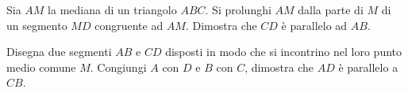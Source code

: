 \begin{multicols}{2}
\begin{esercizio}
\label{ese:3.38}
Sia $AM$ la mediana di un triangolo $ABC$. Si prolunghi $AM$ dalla 
parte di $M$ di un segmento $MD$ congruente ad $AM$. Dimostra che 
$CD$ è parallelo ad $AB$.
\end{esercizio}


\begin{esercizio}
\label{ese:3.42}
Disegna due segmenti $AB$ e $CD$ disposti in modo che si incontrino 
nel loro punto medio comune $M$. Congiungi $A$ con $D$ e $B$ con $C$, 
dimostra che $AD$ è parallelo a $CB$.
\end{esercizio}

% 

% 

\end{multicols}


